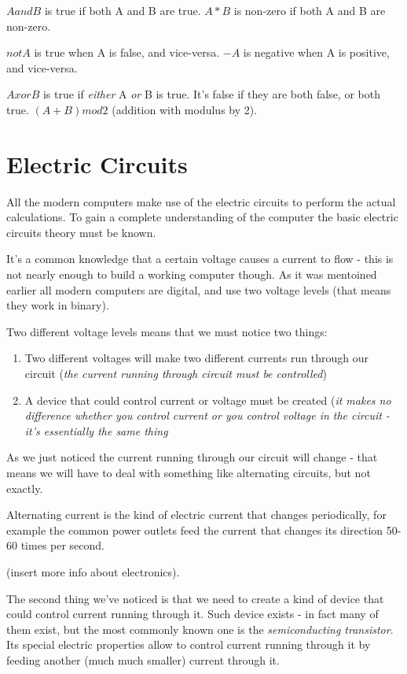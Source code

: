 $A and B$ is true if both A and B are true.
$A * B$ is non-zero if both A and B are non-zero.

$not A$ is true when A is false, and vice-versa.
$-A$ is negative when A is positive, and vice-versa.

$A xor B$ is true if \emph{either} A \emph{or} B is true. It's false if they are both false, or both true.
$(A + B) mod 2$ (addition with modulus by 2).







\section{Electric Circuits}
All the modern computers make use of the electric circuits to perform the actual calculations. To gain a complete understanding of the computer the basic electric circuits theory must be known.

It's a common knowledge that a certain voltage causes a current to flow - this is not nearly enough to build a working computer though. As it was mentoined earlier all modern computers are digital, and use two voltage levels (that means they work in binary).

Two different voltage levels means that we must notice two things:
\begin{enumerate}
	\item Two different voltages will make two different currents run through our circuit (\emph{the current running through circuit must be controlled})
	\item A device that could control current or voltage must be created (\emph{it makes no difference whether you control current or you control voltage in the circuit - it's essentially the same thing}
\end{enumerate}

As we just noticed the current running through our circuit will change - that means we will have to deal with something like alternating circuits, but not exactly.

Alternating current is the kind of electric current that changes periodically, for example the common power outlets feed the current that changes its direction 50-60 times per second.

(insert more info about electronics).

The second thing we've noticed is that we need to create a kind of device that could control current running through it. Such device exists - in fact many of them exist, but the most commonly known one is the \emph{semiconducting transistor}. Its special electric properties allow to control current running through it by feeding another (much much smaller) current through it.

